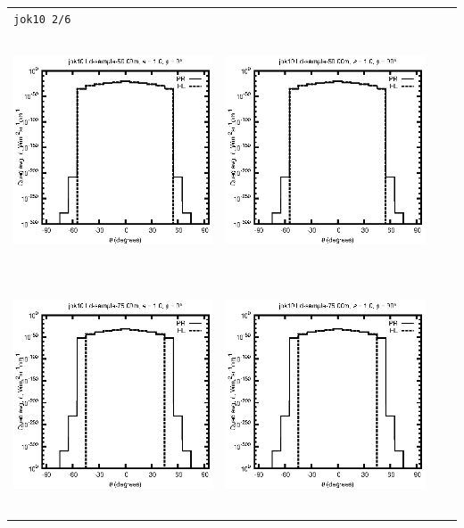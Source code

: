 \documentclass[10pt,a4paper]{article}
\begin{document}
\begin{adjustwidth}{-1.2in}{-1.2in}
\begin{tabular}{c c c c}
\multicolumn{4}{l}{\texttt{jok10 2/6}} \\
\includegraphics[height=7cm]{../eps/jok10_Ld_sample_50.00m_fwd.eps} &
\includegraphics[height=7cm]{../eps/jok10_Ld_sample_50.00m_cross.eps} \\
\includegraphics[height=7cm]{../eps/jok10_Ld_sample_75.00m_fwd.eps} &
\includegraphics[height=7cm]{../eps/jok10_Ld_sample_75.00m_cross.eps} \\

\end{tabular}
\end{adjustwidth}
\end{document}
